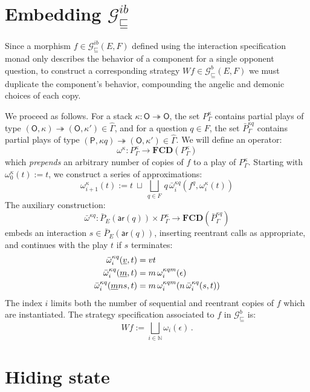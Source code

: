 \documentclass[11pt,oneside,draft]{book}
\theoremstyle{definition}
\newcommand{\gcat}{\mathcal{G}_{\sqsubseteq}}
\newcommand{\kw}[1]{\ensuremath{ \mathsf{#1} }}
\newcommand{\ul}[1]{%
  \underline{\smash{#1}}
}
\begin{document}

\section{Embedding $\gcat^{ib}$} \label{sec:gamesem:emb} %

Since a morphism $f \in \gcat^{ib}(E,F)$
defined using the interaction specification monad
only describes the behavior of a component
for a single opponent question,
to construct a corresponding strategy $W f \in \gcat^b(E,F)$
we must duplicate the component's behavior,
compounding the angelic and demonic choices of each copy.

We proceed as follows.
For a stack
$\kappa : \kw{O} \twoheadrightarrow \kw{O}$,
the set $P^\kappa_\Gamma$ contains
partial plays of type
$(\kw{O}, \kappa) \twoheadrightarrow (\kw{O}, \kappa')
 \in \hat{\Gamma}$,
and for a question $q \in F$,
the set $\bar{P}^{\kappa q}_\Gamma$ contains
partial plays of type
$(\kw{P}, \kappa q) \twoheadrightarrow (\kw{O}, \kappa')
 \in \hat{\Gamma}$.
We will define an operator:
\[
  \omega^\kappa :
    P^\kappa_\Gamma \rightarrow
    \mathbf{FCD}(P^\kappa_\Gamma)
\]
which \emph{prepends} an arbitrary number of copies of $f$
to a play of $P^\kappa_\Gamma$.
Starting with 
$\omega^\kappa_0(t) := t$,
we construct a series of approximations:
\[
  \omega^\kappa_{i+1}(t) :=
    t \: \sqcup \:
    \bigsqcup_{q \in F} \,
      q \, \bar{\omega}^{\kappa q}_i(f^q, \omega^\kappa_i(t))
\]
The auxiliary construction:
\[
  \bar{\omega}^{\kappa q} :
    \bar{P}_E(\kw{ar}(q)) \times P^{\kappa}_\Gamma \rightarrow
    \mathbf{FCD}(\bar{P}^{\kappa q}_\Gamma)
\]
embeds an interaction $s \in \bar{P}_E(\kw{ar}(q))$,
inserting reentrant calls as appropriate,
and continues with the play $t$
if $s$ terminates:
\begin{align*}
  \bar{\omega}^{\kappa q}_i(\ul v, t) &=
    v t
  \\
  \bar{\omega}^{\kappa q}_i(\ul m, t) &=
    m \, \omega^{\kappa q m}_i(\epsilon)
  \\
  \bar{\omega}^{\kappa q}_i(\ul m n s, t) &=
    m \, \omega^{\kappa q m}_i(n \, \bar{\omega}^{\kappa q}_i(s, t))
\end{align*}
The index $i$ limits both the number of
sequential and reentrant copies of $f$
which are instantiated.
The strategy specification associated to $f$
in $\gcat^{b}$ is:
\[
    W f := \bigsqcup_{i \in \mathbb{N}} \omega_i(\epsilon) \,.
\]


\section{Hiding state} \label{sec:gamesem:pack} %
\end{document}
